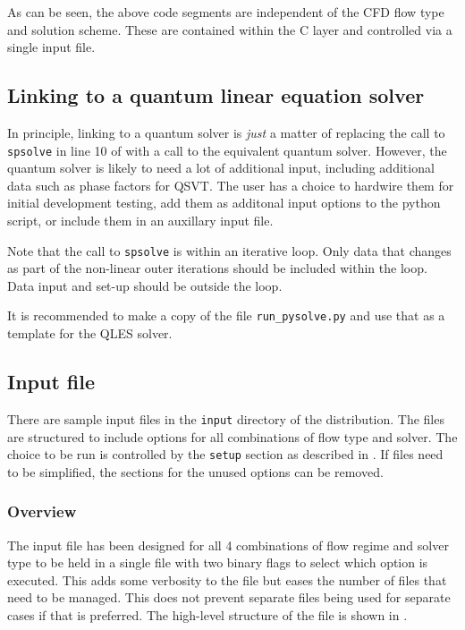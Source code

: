 As can be seen, the above code segments are independent of the CFD flow type and solution scheme.
These are contained within the C layer and controlled via a single input file.



%
\subsection{Linking to a quantum linear equation solver}
\label{subsec-qles}

In principle, linking to a quantum solver is {\it just} a matter of replacing the call to
{\tt spsolve} in line 10 of  with a call to the equivalent quantum solver.
However, the quantum solver is likely to need a lot of additional input, including additional
data such as phase factors for QSVT.
The user has a choice to hardwire them for initial development testing, add them as additonal 
input options to the python script, or include them in an auxillary input file.

Note that the call to {\tt spsolve} is within an iterative loop. Only data that changes as part of the
non-linear outer iterations should be included within the loop.
Data input and set-up should be outside the loop.

It is recommended to make a copy of the file {\tt run\_pysolve.py} and use that as a template 
for the QLES solver.


%
\subsection{Input file}
\label{subsec-ifile}

There are sample input files in the {\tt input} directory of the distribution.
The files are structured to include options for all combinations of flow type and solver.
The choice to be run is controlled by the {\tt setup} section as described in .
If files need to be simplified, the sections for the unused options can be removed. 

%
\subsubsection{Overview}
\label{subsubsec-ifile-overview}

The input file has been designed for all 4 combinations of flow regime and
solver type to be held in a single file with two binary flags to select which option is executed.
This adds some verbosity to the file but eases the number of files that need to be managed.
This does not prevent separate files being used for separate cases if that is preferred.
The high-level structure of the file is shown in  .

